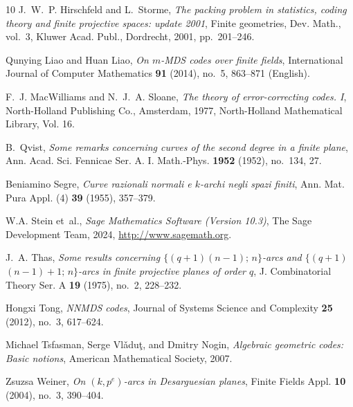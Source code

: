 \documentclass[11pt,a4paper]{amsart}
\theoremstyle{plain}
\theoremstyle{definition}
\theoremstyle{remark}
\begin{document}
\begin{thebibliography}{10}
		J.~W.~P. Hirschfeld and L.~Storme, \emph{The packing problem in statistics,
			coding theory and finite projective spaces: update 2001}, Finite geometries,
		Dev. Math., vol.~3, Kluwer Acad. Publ., Dordrecht, 2001, pp.~201--246.

		Qunying Liao and Huan Liao, \emph{On {{\(m\)}}-{MDS} codes over finite fields},
		International Journal of Computer Mathematics \textbf{91} (2014), no.~5,
		863--871 (English).

		F.~J. MacWilliams and N.~J.~A. Sloane, \emph{The theory of error-correcting
			codes. {I}}, North-Holland Publishing Co., Amsterdam, 1977, North-Holland
		Mathematical Library, Vol. 16. 

		B.~Qvist, \emph{Some remarks concerning curves of the second degree in a finite
			plane}, Ann. Acad. Sci. Fennicae Ser. A. I. Math.-Phys. \textbf{1952} (1952),
		no.~134, 27. 

		Beniamino Segre, \emph{Curve razionali normali e {$k$}-archi negli spazi
			finiti}, Ann. Mat. Pura Appl. (4) \textbf{39} (1955), 357--379. 

		W.\thinspace{}A. Stein et~al., \emph{{S}age {M}athematics {S}oftware ({V}ersion
			10.3)}, The Sage Development Team, 2024, \url{http://www.sagemath.org}.

		J.~A. Thas, \emph{Some results concerning {$\{(q+1)(n-1);\,n\}$}-arcs and
			{$\{(q+1)$} {$(n-1)+1;\,n\}$}-arcs in finite projective planes of order
			{$q$}}, J. Combinatorial Theory Ser. A \textbf{19} (1975), no.~2, 228--232.

		Hongxi Tong, \emph{{NNMDS} codes}, Journal of Systems Science and Complexity
		\textbf{25} (2012), no.~3, 617--624.

		Michael Tsfasman, Serge Vl{\v{a}}du{\c{t}}, and Dmitry Nogin, \emph{Algebraic
			geometric codes: Basic notions}, American Mathematical Society, 2007.

		Zsuzsa Weiner, \emph{On {$(k,p^e)$}-arcs in {D}esarguesian planes}, Finite
		Fields Appl. \textbf{10} (2004), no.~3, 390--404. 

	\end{thebibliography}
\end{document}
